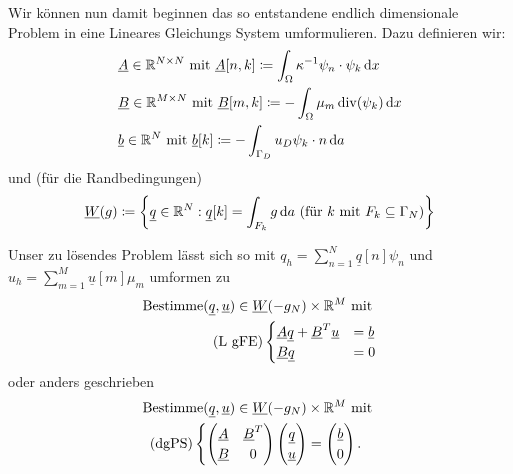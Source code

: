 Wir können nun damit beginnen das so entstandene endlich dimensionale Problem in eine Lineares Gleichungs System umformulieren. Dazu definieren wir:
	\begin{align*}
	&\underline{A} \in \mathbb{R}^{N \times N} \text{ mit } \underline{A}[n,k] \coloneqq \int_{\Omega} \kappa^{-1} \psi_n \cdot \psi_k \, \mathrm{d} x \\
	&\underline{B} \in \mathbb{R}^{M \times N} \text{ mit } \underline{B}[m,k] \coloneqq - \int_{\Omega} \mu_m \operatorname{div}(\psi_k) \, \mathrm{d} x \\
	&\underline{b} \in \mathbb{R}^N \text{ mit } \underline{b}[k] \coloneqq - \int_{\Gamma_D} u_D \psi_k \cdot n \, \mathrm{d} a
	\end{align*}
	und (für die Randbedingungen)
	\begin{align*}
	\underline{W}(g) \coloneqq \left\{ \underline{q} \in \mathbb{R}^N : \underline{q}[k] = \int_{F_k} g  \, \mathrm{d} a \ (\text{für } k \text{ mit } F_k \subseteq \Gamma_N) \right\} 
	\end{align*}


Unser zu lösendes Problem lässt sich so mit $ q_h = \sum_{n=1}^{N} \underline{q}[n] \psi_n $ und $ u_h = \sum_{m=1}^{M} \underline{u}[m] \mu_m $ umformen zu 
\begin{align*}
\text{Bestimme} (\underline{q},\underline{u}) \in \underline{W}(-g_N)\times \mathbb{R}^M \text{ mit }\\
\text{(L gFE)}\begin{cases}
\underline{A} \underline{q} + \underline{B}^T \underline{u} &= \underline{b} \\
\underline{B} \underline{q} &= 0
\end{cases}
\end{align*}
oder anders geschrieben 
\begin{align*}
\text{Bestimme} (\underline{q},\underline{u}) \in \underline{W}(-g_N)\times \mathbb{R}^M \text{ mit }\\
\text{(dgPS)}\begin{cases}
\begin{pmatrix}
\underline{A} &\underline{B}^T\\
\underline{B} &0
\end{pmatrix}
\begin{pmatrix}
\underline{q} \\
\underline{u} 
\end{pmatrix}
=
\begin{pmatrix}
\underline{b}\\
0
\end{pmatrix}.
\end{cases}
\end{align*}

